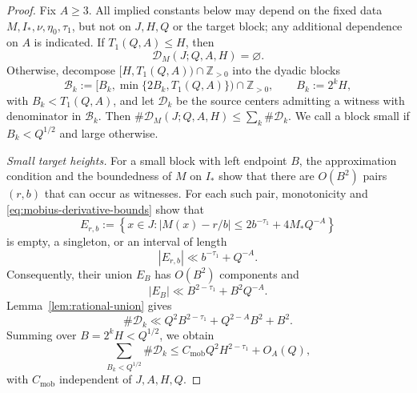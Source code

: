 \documentclass[11pt]{amsart}
\numberwithin{equation}{section}
\theoremstyle{definition}
\theoremstyle{remark}
\newcommand{\Z}{\mathbb Z}
\newcommand{\abs}[1]{\left\lvert #1\right\rvert}
\newcommand{\set}[1]{\left\{#1\right\}}
\begin{document}
\begin{proof}
Fix \(A\geq3\). All implied constants below may depend on the fixed
data \(M,I_*,\nu,\eta_0,\tau_1\), but not on \(J,H,Q\) or the target
block; any additional dependence on \(A\) is indicated.
If \(T_1(Q,A)\leq H\), then
\[
\mathcal D_M(J;Q,A,H)=\varnothing.
\]
Otherwise, decompose \([H,T_1(Q,A))\cap\Z_{>0}\) into the dyadic blocks
\[
\mathcal B_k
:=[B_k,\min\{2B_k,T_1(Q,A)\})\cap\Z_{>0},
\qquad B_k:=2^kH,
\]
with \(B_k<T_1(Q,A)\), and let \(\mathcal D_k\) be the source
centers admitting a witness with denominator in \(\mathcal B_k\).
Then \(\#\mathcal D_M(J;Q,A,H)\leq\sum_k\#\mathcal D_k\).
We call a block small if \(B_k<Q^{1/2}\) and large otherwise.

\smallskip
\noindent\textit{Small target heights.}
For a small block with left endpoint \(B\), the approximation condition
and the boundedness of \(M\) on \(I_*\) show that there are \(O(B^2)\)
pairs \((r,b)\) that can occur as witnesses. For each such pair,
monotonicity and \eqref{eq:mobius-derivative-bounds} show that
\[
E_{r,b}
:=
\set{x\in J:
\abs{M(x)-r/b}\leq2b^{-\tau_1}+4M_*Q^{-A}}
\]
is empty, a singleton, or an interval of length
\[
|E_{r,b}|\ll b^{-\tau_1}+Q^{-A}.
\]
Consequently, their union \(E_B\) has \(O(B^2)\) components and
\[
|E_B|\ll B^{2-\tau_1}+B^2Q^{-A}.
\]
Lemma~\ref{lem:rational-union} gives
\[
\#\mathcal D_k
\ll
Q^2B^{2-\tau_1}+Q^{2-A}B^2+B^2.
\]
Summing over \(B=2^kH<Q^{1/2}\), we obtain
\begin{equation}\label{eq:mobius-small-total}
\sum_{B_k<Q^{1/2}}\#\mathcal D_k
\leq
C_{\mathrm{mob}}Q^2H^{2-\tau_1}+O_A(Q),
\end{equation}
with \(C_{\mathrm{mob}}\) independent of \(J,A,H,Q\).


\end{proof}
\end{document}
